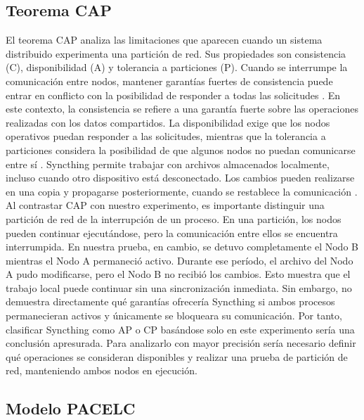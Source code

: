 \documentclass[12pt,a4paper]{article}
\begin{document}
\subsection{Teorema CAP}
El teorema CAP analiza las limitaciones que aparecen 
cuando un sistema distribuido experimenta una partición de red. Sus propiedades son consistencia (C), disponibilidad (A) y tolerancia a particiones (P). Cuando se interrumpe la comunicación entre nodos, mantener garantías fuertes de consistencia puede entrar en conflicto con la posibilidad de responder a todas las solicitudes \cite{ahmed2023,lee2023}.
En este contexto, la consistencia se refiere a una garantía fuerte sobre las operaciones realizadas con los datos compartidos. La disponibilidad exige que los nodos operativos puedan responder a las solicitudes, 
mientras que la tolerancia a particiones considera la posibilidad de que algunos nodos no puedan comunicarse entre sí \cite{ahmed2023}.
Syncthing permite trabajar con archivos almacenados localmente, 
incluso cuando otro dispositivo está desconectado. Los cambios pueden realizarse en una copia y propagarse posteriormente, cuando se restablece la comunicación \cite{syncthingFAQ,syncthingSyncing}.
Al contrastar CAP con nuestro experimento, es importante distinguir 
una partición de red de la interrupción de un proceso. En una partición, los nodos pueden continuar ejecutándose, pero la comunicación entre ellos se encuentra interrumpida. En nuestra prueba, en cambio, se detuvo completamente el Nodo B mientras el Nodo A permaneció activo.
Durante ese período, el archivo del Nodo A pudo modificarse, pero el Nodo B no recibió los cambios. Esto muestra que el trabajo local puede continuar sin una sincronización inmediata. Sin embargo, no demuestra directamente qué garantías ofrecería Syncthing si ambos procesos permanecieran activos y únicamente se bloqueara su comunicación.
Por tanto, clasificar Syncthing como AP o CP basándose solo en este experimento sería una conclusión apresurada. Para analizarlo con mayor precisión sería necesario definir qué operaciones se consideran disponibles y realizar una prueba de partición de red, manteniendo ambos nodos en ejecución.

\subsection{Modelo PACELC}
\end{document}
